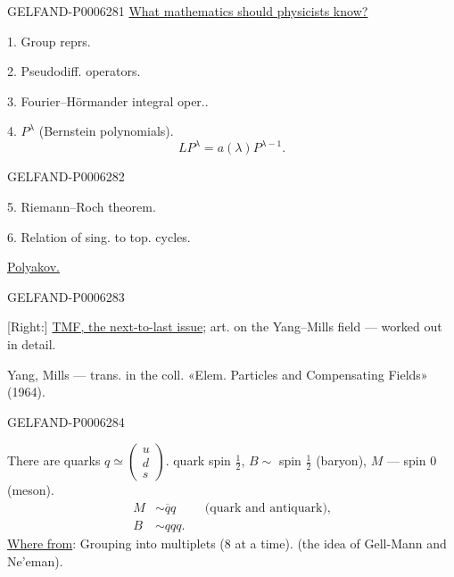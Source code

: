 \begin{GelfandAdjacentEvidence}{GELFAND-P000628}{1}
\underline{What mathematics should physicists know?}

1. Group reprs.

2. Pseudodiff. operators.

3. Fourier--Hörmander integral oper..

4. \(P^\lambda\) (Bernstein polynomials).
\[
LP^\lambda=a(\lambda)P^{\lambda-1}.
\]
\end{GelfandAdjacentEvidence}
\begin{GelfandAdjacentEvidence}{GELFAND-P000628}{2}


5. Riemann--Roch theorem.

6. Relation of sing. to top. cycles.

\underline{Polyakov.}
\end{GelfandAdjacentEvidence}
\begin{GelfandAdjacentEvidence}{GELFAND-P000628}{3}

[Right:] \underline{TMF, the next-to-last issue}; art. on the Yang--Mills field --- worked out in detail.

Yang, Mills --- trans. in the coll. «Elem. Particles and Compensating Fields» (1964).
\end{GelfandAdjacentEvidence}
\begin{GelfandAdjacentEvidence}{GELFAND-P000628}{4}


There are quarks \(q\simeq\begin{pmatrix}u\\d\\s\end{pmatrix}\).
quark spin \(\tfrac12\),
\(B\sim\) spin \(\tfrac12\) (baryon),
\(M\) --- spin \(0\) (meson).
\[
\begin{aligned}
M&\sim\overline q q&&\text{(quark and antiquark)},\\
B&\sim qqq.
\end{aligned}
\]
\underline{Where from}: Grouping into multiplets (8 at a time).
(the idea of Gell-Mann and Ne’eman).
\end{GelfandAdjacentEvidence}
